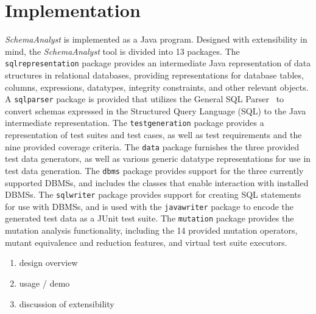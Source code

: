 \section{Implementation}

\textit{SchemaAnalyst} is implemented as a Java program.  Designed with extensibility in mind, the
\textit{SchemaAnalyst} tool is divided into 13 packages. The \texttt{sqlrepresentation} package
provides an intermediate Java representation of data structures in relational databases,
providing representations for database tables, columns, expressions, datatypes, integrity
constraints, and other relevant objects. A \texttt{sqlparser} package is provided that utilizes the
General SQL Parser~\cite{} to convert schemas expressed in the Structured Query Language (SQL) to the
Java intermediate representation. The \texttt{testgeneration} package provides a representation of test
suites and test cases, as well as test requirements and the nine provided coverage criteria. The
\texttt{data} package furnishes the three provided test data generators, as well as various generic
datatype representations for use in test data generation. The \texttt{dbms} package provides support
for the three currently supported DBMSs, and includes the classes that enable interaction with
installed DBMSs. The \texttt{sqlwriter} package provides support for creating SQL statements for use
with DBMSs, and is used with the \texttt{javawriter} package to encode the generated test data as a
JUnit test suite. The \texttt{mutation} package provides the mutation analysis functionality, 
including the 14 provided mutation operators, mutant equivalence and reduction features, and virtual
test suite executors.



\begin{enumerate}
\item design overview 
\item usage / demo
\item discussion of extensibility
\end{enumerate}
